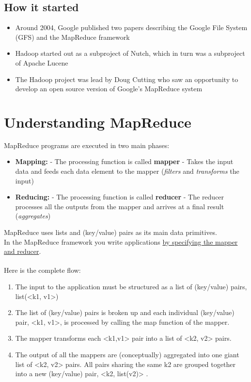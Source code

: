 \documentclass{article}
\begin{document}
\begin{multicols}{2}
\subsection{How it started}
\begin{itemize}
\item Around 2004, Google published two papers describing the Google File System (GFS) and the MapReduce framework
\item Hadoop started out as a subproject of Nutch, which in turn was a subproject of Apache Lucene
\item The Hadoop project was lead by Doug Cutting who saw an opportunity to develop an open source version of Google's MapReduce system
\end{itemize}



\section{Understanding MapReduce}
MapReduce programs are executed in two main phases:
\begin{itemize}
\item \textbf{Mapping:} 
\subitem - The processing function is called \textbf{mapper}
\subitem - Takes the input data and feeds each data element to the mapper (\emph{filters} and \emph{transforms} the input)
\item \textbf{Reducing:} 
\subitem - The processing function is called \textbf{reducer}
\subitem - The reducer processes all the outputs from the mapper and arrives at a final result (\emph{aggregates})
\end{itemize}

MapReduce uses lists and (key/value) pairs as its main data primitives.\\
In the MapReduce framework you write applications \underline{by specifying the mapper and reducer}.\\\\
Here is the complete flow:
\begin{enumerate}
\item The input to the application must be structured as a list of (key/value) pairs, list(<k1, v1>)
\item The list of (key/value) pairs is broken up and each individual (key/value) pair, <k1, v1>, is processed by calling the map function of the mapper.
\item The mapper transforms each <k1,v1> pair into a list of <k2, v2> pairs.
\item The output of all the mappers are (conceptually) aggregated into one giant list of <k2, v2> pairs. All pairs sharing the same k2 are grouped together into a new (key/value) pair, <k2, list(v2)> .
\end{enumerate}


\end{multicols}
\end{document}
